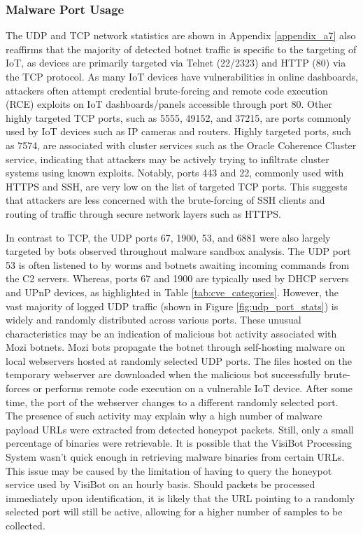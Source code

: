 \subsubsection{Malware Port Usage}

The UDP and TCP network statistics are shown in Appendix \ref{appendix_a7} also reaffirms that the majority of detected botnet traffic is specific to the targeting of IoT, as devices are primarily targeted via Telnet (22/2323) and HTTP (80) via the TCP protocol. As many IoT devices have vulnerabilities in online dashboards, attackers often attempt credential brute-forcing and remote code execution (RCE) exploits on IoT dashboards/panels accessible through port 80. Other highly targeted TCP ports, such as 5555, 49152, and 37215, are ports commonly used by IoT devices such as IP cameras and routers. Highly targeted ports, such as 7574, are associated with cluster services such as the Oracle Coherence Cluster service, indicating that attackers may be actively trying to infiltrate cluster systems using known exploits. Notably, ports 443 and 22, commonly used with HTTPS and SSH, are very low on the list of targeted TCP ports. This suggests that attackers are less concerned with the brute-forcing of SSH clients and routing of traffic through secure network layers such as HTTPS.

In contrast to TCP, the UDP ports 67, 1900, 53, and 6881 were also largely targeted by bots observed throughout malware sandbox analysis. The UDP port 53 is often listened to by worms and botnets awaiting incoming commands from the C2 servers. \citep{SpeedguidePort53} Whereas, ports 67 and 1900 are typically used by DHCP servers and UPnP devices, as highlighted in Table \ref{tab:cve_categories}. However, the vast majority of logged UDP traffic (shown in Figure \ref{fig:udp_port_stats}) is widely and randomly distributed across various ports. These unusual characteristics may be an indication of malicious bot activity associated with Mozi botnets. Mozi bots propagate the botnet through self-hosting malware on local webservers hosted at randomly selected UDP ports. The files hosted on the temporary webserver are downloaded when the malicious bot successfully brute-forces or performs remote code execution on a vulnerable IoT device. After some time, the port of the webserver changes to a different randomly selected port. The presence of such activity may explain why a high number of malware payload URLs were extracted from detected honeypot packets. Still, only a small percentage of binaries were retrievable. It is possible that the VisiBot Processing System wasn't quick enough in retrieving malware binaries from certain URLs. This issue may be caused by the limitation of having to query the honeypot service used by VisiBot on an hourly basis. Should packets be processed immediately upon identification, it is likely that the URL pointing to a randomly selected port will still be active, allowing for a higher number of samples to be collected.

